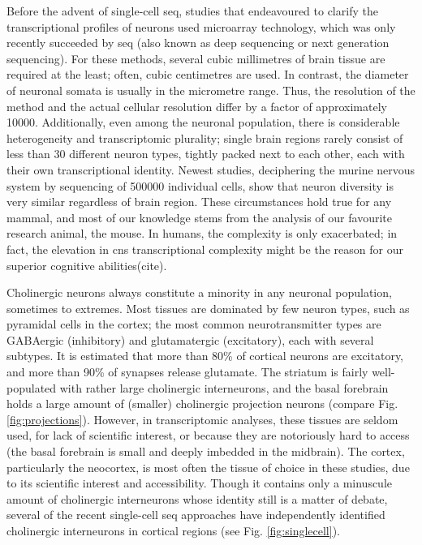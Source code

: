 Before the advent of single-cell \ac{seq}, studies that endeavoured to clarify the transcriptional profiles of neurons used microarray technology, which was only recently succeeded by \ac{seq} (also known as deep sequencing or next generation sequencing). For these methods, several cubic millimetres of brain tissue are required at the least; often, cubic centimetres are used. In contrast, the diameter of neuronal somata is usually in the micrometre range. Thus, the resolution of the method and the actual cellular resolution differ by a factor of approximately \num{10000}. Additionally, even among the neuronal population, there is considerable heterogeneity and transcriptomic plurality; single brain regions rarely consist of less than 30 different neuron types, tightly packed next to each other, each with their own transcriptional identity\cite{Darmanis2015, Zeisel2015, Tasic2016, Habib2016}. Newest studies, deciphering the murine nervous system by sequencing of \num{500000} individual cells, show that neuron diversity is very similar regardless of brain region\cite{Zeisel2018}. These circumstances hold true for any mammal, and most of our knowledge stems from the analysis of our favourite research animal, the mouse. In humans, the complexity is only exacerbated; in fact, the elevation in \ac{cns} transcriptional complexity might be the reason for our superior cognitive abilities(cite).

Cholinergic neurons always constitute a minority in any neuronal population, sometimes to extremes. Most tissues are dominated by few neuron types, such as pyramidal cells in the cortex; the most common neurotransmitter types are GABAergic (inhibitory) and glutamatergic (excitatory), each with several subtypes. It is estimated that more than 80\% of cortical neurons are excitatory, and more than 90\% of synapses release glutamate\cite{Raichle2002}. The striatum is fairly well-populated with rather large cholinergic interneurons, and the basal forebrain holds a large amount of (smaller) cholinergic projection neurons (compare Fig. \ref{fig:projections}). However, in transcriptomic analyses, these tissues are seldom used, for lack of scientific interest, or because they are notoriously hard to access (the basal forebrain is small and deeply imbedded in the midbrain). The cortex, particularly the neocortex, is most often the tissue of choice in these studies, due to its scientific interest and accessibility. Though it contains only a minuscule amount of cholinergic interneurons whose identity still is a matter of debate, several of the recent single-cell \ac{seq} approaches have independently identified cholinergic interneurons in cortical regions (see Fig. \ref{fig:singlecell}). 


